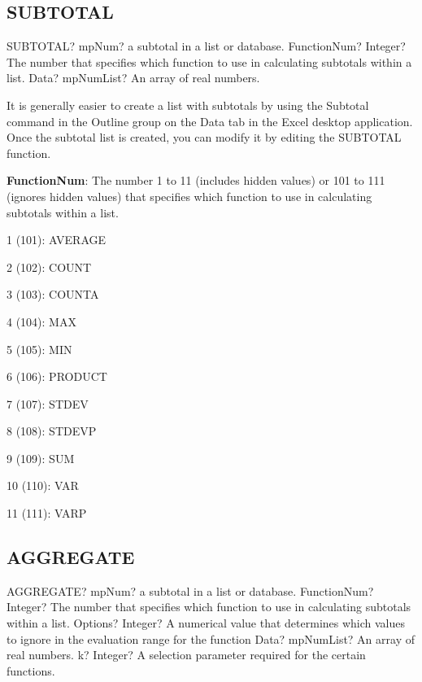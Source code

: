 \subsection{SUBTOTAL}

\begin{mpFunctionsExtract}
	\mpWorksheetFunctionTwoNotImplemented
	{SUBTOTAL? mpNum? a subtotal in a list or database.}
	{FunctionNum? Integer?  The number that specifies which function to use in calculating subtotals within a list.}
	{Data? mpNumList? An array of real numbers.}
\end{mpFunctionsExtract}


\vspace{0.3cm}
It is generally easier to create a list with subtotals by using the Subtotal command in the Outline group on the Data tab in the Excel desktop application. Once the subtotal list is created, you can modify it by editing the SUBTOTAL function.

\vspace{0.3cm}
\textsf{\textbf{FunctionNum}}: The number 1 to 11 (includes hidden values) or 101 to 111 (ignores hidden values) that specifies which function to use in calculating subtotals within a list.


1 (101): AVERAGE 

2 (102): COUNT 

3 (103): COUNTA 

4 (104): MAX 

5 (105): MIN 

6 (106): PRODUCT 

7 (107): STDEV 

8 (108): STDEVP 

9 (109): SUM 

10 (110): VAR 

11 (111): VARP 





\subsection{AGGREGATE}


\begin{mpFunctionsExtract}
	\mpWorksheetFunctionFourNotImplemented
	{AGGREGATE? mpNum? a subtotal in a list or database.}
	{FunctionNum? Integer?  The number that specifies which function to use in calculating subtotals within a list.}
	{Options? Integer?  A numerical value that determines which values to ignore in the evaluation range for the function}
	{Data? mpNumList? An array of real numbers.}
	{k? Integer?  A selection parameter required for the certain functions.}
\end{mpFunctionsExtract}



